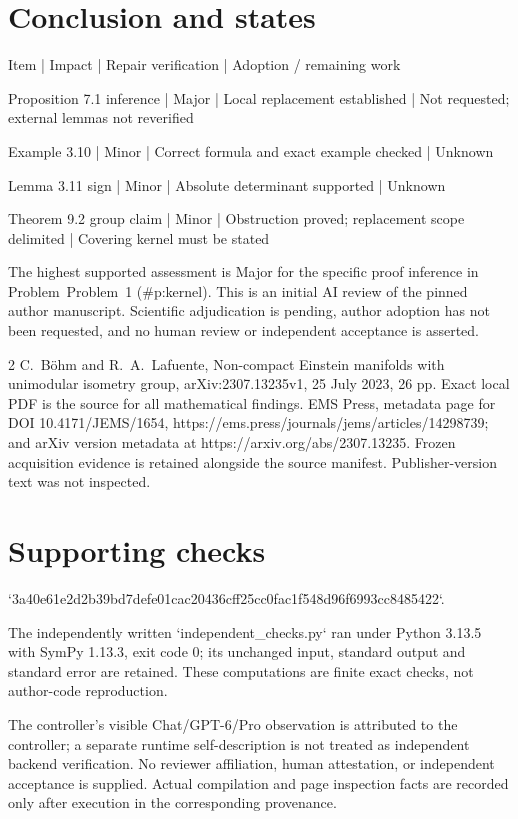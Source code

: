 \documentclass[10pt]{article}
\begin{document}
\section*{Conclusion and states}
Item | Impact | Repair verification | Adoption / remaining work\par
Proposition 7.1 inference | Major | Local replacement established | Not requested; external lemmas not reverified\par
Example 3.10 | Minor | Correct formula and exact example checked | Unknown\par
Lemma 3.11 sign | Minor | Absolute determinant supported | Unknown\par
Theorem 9.2 group claim | Minor | Obstruction proved; replacement scope delimited | Covering kernel must be stated\par
The highest supported assessment is Major for the specific proof inference in Problem Problem 1 (\#p:kernel). This is an initial AI review of the pinned author manuscript. Scientific adjudication is pending, author adoption has not been requested, and no human review or independent acceptance is asserted.\par
2 C. Böhm and R. A. Lafuente, Non-compact Einstein manifolds with unimodular isometry group, arXiv:2307.13235v1, 25 July 2023, 26 pp. Exact local PDF is the source for all mathematical findings. EMS Press, metadata page for DOI 10.4171/JEMS/1654, https://ems.press/journals/jems/articles/14298739; and arXiv version metadata at https://arxiv.org/abs/2307.13235. Frozen acquisition evidence is retained alongside the source manifest. Publisher-version text was not inspected.\par
\section*{Supporting checks}
`3a40e61e2d2b39bd7defe01cac20436cff25cc0fac1f548d96f6993cc8485422`.\par
The independently written `independent\_checks.py` ran under Python 3.13.5 with SymPy 1.13.3, exit code 0; its unchanged input, standard output and standard error are retained. These computations are finite exact checks, not author-code reproduction.\par
The controller’s visible Chat/GPT-6/Pro observation is attributed to the controller; a separate runtime self-description is not treated as independent backend verification. No reviewer affiliation, human attestation, or independent acceptance is supplied. Actual compilation and page inspection facts are recorded only after execution in the corresponding provenance.\par
\end{document}
